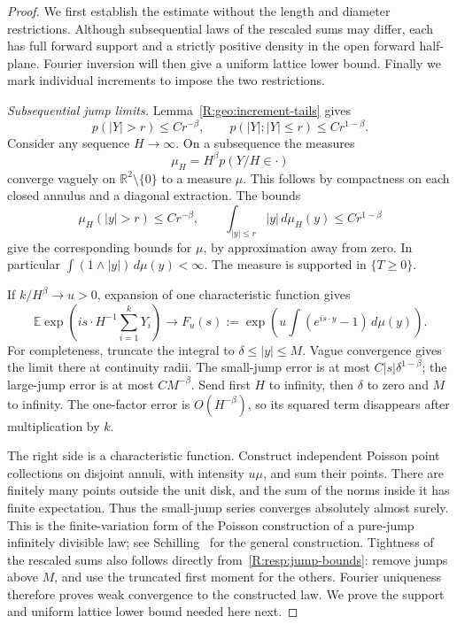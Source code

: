 \begin{proof}
We first establish the estimate without the length and diameter restrictions. Although subsequential laws of the rescaled sums may differ, each has full forward support and a strictly positive density in the open forward half-plane. Fourier inversion will then give a uniform lattice lower bound. Finally we mark individual increments to impose the two restrictions.

\emph{Subsequential jump limits.} Lemma~\ref{R:geo:increment-tails} gives
\begin{equation}
 p(|Y|>r)\le Cr^{-\beta},\qquad
 p(|Y|;|Y|\le r)\le Cr^{1-\beta}.
 \label{R:resp:jump-bounds}
\end{equation}
Consider any sequence $H\to\infty$. On a subsequence the measures
\[
 \mu_H=H^\beta p(Y/H\in\cdot)
\]
converge vaguely on $\mathbb R^2\setminus\{0\}$ to a measure $\mu$. This follows by compactness on each closed annulus and a diagonal extraction. The bounds
\[
 \mu_H(|y|>r)\le Cr^{-\beta},\qquad
 \int_{|y|\le r}|y|\,d\mu_H(y)\le Cr^{1-\beta}
\]
give the corresponding bounds for $\mu$, by approximation away from zero. In particular $\int(1\wedge|y|)\,d\mu(y)<\infty$. The measure is supported in $\{T\ge0\}$.

If $k/H^\beta\to u>0$, expansion of one characteristic function gives
\begin{equation}
 \mathbb E\exp\left(is\cdot H^{-1}\sum_{i=1}^kY_i\right)
 \longrightarrow
 F_u(s):=\exp\left(u\int(e^{is\cdot y}-1)\,d\mu(y)\right).
 \label{R:resp:poisson-transform}
\end{equation}
For completeness, truncate the integral to $\delta\le|y|\le M$. Vague convergence gives the limit there at continuity radii. The small-jump error is at most $C|s|\delta^{1-\beta}$; the large-jump error is at most $CM^{-\beta}$. Send first $H$ to infinity, then $\delta$ to zero and $M$ to infinity. The one-factor error is $O(H^{-\beta})$, so its squared term disappears after multiplication by $k$.

The right side is a characteristic function. Construct independent Poisson point collections on disjoint annuli, with intensity $u\mu$, and sum their points. There are finitely many points outside the unit disk, and the sum of the norms inside it has finite expectation. Thus the small-jump series converges absolutely almost surely. This is the finite-variation form of the Poisson construction of a pure-jump infinitely divisible law; see Schilling~\cite[Chapter~7]{Schilling2016} for the general construction. Tightness of the rescaled sums also follows directly from~\eqref{R:resp:jump-bounds}: remove jumps above $M$, and use the truncated first moment for the others. Fourier uniqueness therefore proves weak convergence to the constructed law. We prove the support and uniform lattice lower bound needed here next.


\end{proof}
